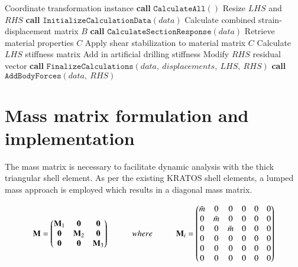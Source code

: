 \begin{algorithm}
	\onehalfspacing
	\label{DSG triangle element stiffness matrix}
	\begin{algorithmic}[1]
		\Require Coordinate transformation instance
		\State \textbf{call} $\texttt{CalculateAll}()$
		\State Resize $LHS$ and $RHS$
		\State \textbf{call} $\texttt{InitializeCalculationData}(data)$
		\State \hspace{\algorithmicindent}Calculate combined strain-displacement matrix $B$
		\State \textbf{call} $\texttt{CalculateSectionResponse}(data)$
		\State \hspace{\algorithmicindent}Retrieve material properties $C$
		\State \hspace{\algorithmicindent}Apply shear stabilization to material matrix $C$
		\State Calculate $LHS$ stiffness matrix
		\State Add in artificial drilling stiffness
		\State Modify $RHS$ residual vector
		\State \textbf{call} $\texttt{FinalizeCalculations}(data,\ displacements,\ LHS,\ RHS)$
		\State \textbf{call} $\texttt{AddBodyForces}(data,\ RHS)$
	\end{algorithmic}
\end{algorithm}




\section{Mass matrix formulation and implementation}

The mass matrix is necessary to facilitate dynamic analysis with the thick triangular shell element. As per the existing KRATOS shell elements, a lumped mass approach is employed which results in a diagonal mass matrix.

\begin{equation} 
\mathbf{M} =  
\begin{pmatrix}
\mathbf{M}_1 & \mathbf{0} & \mathbf{0}\\
\mathbf{0} & \mathbf{M}_2 & \mathbf{0}\\
\mathbf{0} & \mathbf{0} & \mathbf{M}_3
\end{pmatrix}
\hspace{10mm}
where
\hspace{10mm}
\mathbf{M}_i =  
\begin{pmatrix}
\bar{m} & 0 & 0 & 0 & 0 & 0\\
0 & \bar{m} & 0 & 0 & 0 & 0\\
0 & 0 & \bar{m} &0 & 0 & 0\\
0 & 0 & 0 & 0 & 0 & 0\\
0 & 0 & 0 & 0 & 0 & 0\\
0 & 0 & 0 & 0 & 0 & 0
\end{pmatrix}
\label{eqt15}
\end{equation}

